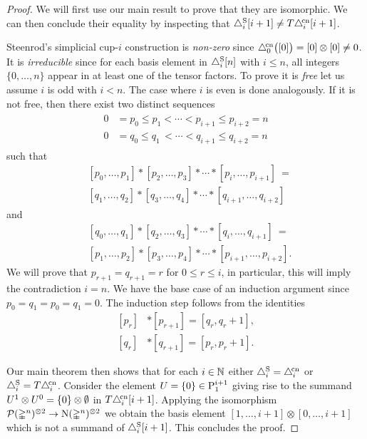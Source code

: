 \begin{proof}
	We will first use our main result to prove that they are isomorphic.
	We can then conclude their equality by inspecting that $\triangle^{\mathrm{S}}_i [i+1] \neq T \triangle^{\!\mathrm{cn}}_i [i+1]$.

	Steenrod's simplicial \mbox{cup-$i$} construction is \emph{non-zero} since $\triangle^{\!\mathrm{cn}}_0\big([0]\big) = [0] \otimes [0] \neq 0$.
	It is \emph{irreducible} since for each basis element in $\triangle^{\mathrm{S}}_i [n]$ with $i \leq n$, all integers $\{0, \dots, n\}$ appear in at least one of the tensor factors.
	To prove it is \emph{free} let us assume $i$ is odd with $i < n$.
	The case where $i$ is even is done analogously.
	If it is not free, then there exist two distinct sequences
	\begin{align*}
	\begin{split}
	0 &= p_0 \leq p_1 < \cdots < p_{i+1} \leq p_{i+2} = n \\
	0 &= q_0 \leq q_1 \,< \cdots < q_{i+1} \leq q_{i+2} = n
	\end{split}
	\end{align*}
	such that
	\[
	\begin{split}
	&[ {p_0}, \dots, {p_1} ] \ast [ {p_2}, \dots, {p_3} ] \ast \cdots \ast [ {p_{i}}, \dots, {p_{i+1}} ]\ = \\
	&[ {q_1}, \dots, {q_2} ] \ast [ {q_3}, \dots, {q_4} ] \ast \cdots \ast [ {q_{i+1}}, \dots, {q_{i+2}} ]
	\end{split}
	\]
	and
	\[
	\begin{split}
	&[ {q_0}, \dots, {q_1} ] \ast [ {q_2}, \dots, {q_3} ] \ast \cdots \ast [ {q_{i}}, \dots, {q_{i+1}} ]\ = \\
	&[ {p_1}, \dots, {p_2} ] \ast [ {p_3}, \dots, {p_4} ] \ast \cdots \ast [ {p_{i+1}}, \dots, {p_{i+2}} ].
	\end{split}
	\]
	We will prove that $p_{r+1} = q_{r+1} = r$ for $0 \leq r \leq i$, in particular, this will imply the contradiction $i = n$.
	We have the base case of an induction argument since $p_0 = q_1 = p_0 = q_1 = 0$.
	The induction step follows from the identities
	\[
	\begin{split}
	[p_r] &\ast [p_{r+1}] = [q_r, q_{r}+1], \\
	[q_r] &\ast [q_{r+1}] = [p_r, p_{r}+1].
	\end{split}
	\]

	Our main theorem then shows that for each $i \in \mathbb{N}$ either $\triangle^{\mathrm{S}}_i = \triangle^{\!\mathrm{cn}}_i$ or $\triangle^{\mathrm{S}}_i = T \triangle^{\!\mathrm{cn}}_i$.
	Consider the element $U = \{0\} \in \mathrm{P}_{1}^{i+1}$ giving rise to the summand $U^1 \otimes U^0 = \{0\} \otimes \emptyset$ in $T \triangle^{\!\mathrm{cn}}_i [i+1]$.
	Applying the isomorphism $\mathcal{P}(\mathbb{\Delta}^n)^{\otimes 2} \to \operatorname{N}(\mathbb{\Delta}^n)^{\otimes 2}$ we obtain the basis element $[1,\dots,i+1] \otimes [0,\dots,i+1]$ which is not a summand of $\triangle^{\mathrm{S}}_i [i+1]$.
	This concludes the proof.
\end{proof}

